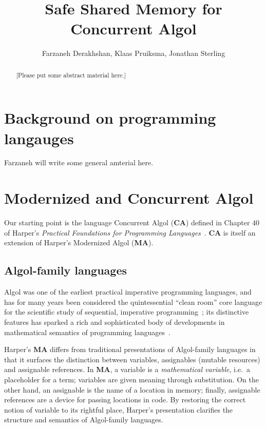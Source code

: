 \documentclass{article}
\title{Safe Shared Memory for Concurrent Algol}
\author{Farzaneh Derakhshan, Klaas Pruiksma, Jonathan Sterling}
\newcommand\Lang[1]{{\sffamily\bfseries{#1}}}
\newcommand\LangCA{\Lang{CA}}
\newcommand\LangMA{\Lang{MA}}
\begin{document}
\maketitle

\begin{abstract}
  [Please put some abstract material here.]
\end{abstract}

\section{Background on programming langauges}

Farzaneh will write some general amterial here.

\section{Modernized and Concurrent Algol}

Our starting point is the language Concurrent Algol (\LangCA) defined
in Chapter 40 of Harper's \emph{Practical Foundations for Programming
  Languages}~\cite{harper:2016}. \LangCA{} is itself an extension of
Harper's Modernized Algol (\LangMA).

\subsection{Algol-family languages}

Algol was one of the earliest practical imperative programming
languages, and has for many years been considered the quintessential
``clean room'' core language for the scientific study of sequential,
imperative programming~\cite{reynolds:1997}; its distinctive features
has sparked a rich and sophisticated body of developments in
mathematical semantics of programming
languages~\cite{mccusker-power:2010}.

Harper's \LangMA{} differs from traditional presentations of
Algol-family languages in that it surfaces the distinction between
variables, assignables (mutable resources) and assignable
references. In \LangMA{}, a variable is a \emph{mathematical
  variable}, i.e.\ a placeholder for a term; variables are given
meaning through substitution. On the other hand, an assignable is the
name of a location in memory; finally, assignable references are a
device for passing locations in code. By restoring the correct notion
of variable to its rightful place, Harper's presentation clarifies the
structure and semantics of Algol-family languages.
\end{document}
